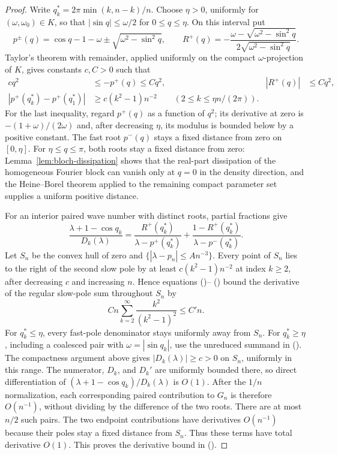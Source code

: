 \documentclass[twoside,10pt]{article}
\numberwithin{equation}{section}
\theoremstyle{slbody}
\theoremstyle{definition}
\theoremstyle{remark}
\renewcommand{\eqref}[1]{%
  \textup{{\normalfont(\oldstylenums{\ref{#1}}}\normalfont)}}
\begin{document}
\begin{proof}
Write $q_k^*=2\pi\min(k,n-k)/n$.  Choose $\eta>0$, uniformly for
$(\omega,\omega_0)\in K$, so that
$|\sin q|\le\omega/2$ for $0\le q\le\eta$.  On this interval put
\[
 p^\pm(q)=\cos q-1-\omega
       \pm\sqrt{\omega^2-\sin^2q},
 \qquad
 R^+(q)=-\frac{\omega-\sqrt{\omega^2-\sin^2q}}
                   {2\sqrt{\omega^2-\sin^2q}}.
\]
Taylor's theorem with remainder, applied uniformly on the compact
$\omega$-projection of $K$, gives constants $c,C>0$ such that
\begin{align}
 c q^2&\le -p^+(q)\le Cq^2,
 &|R^+(q)|&\le Cq^2,\label{eq:fixed-small-wave-bounds}\\
 |p^+(q_k^*)-p^+(q_1^*)|
   &\ge c(k^2-1)n^{-2}\qquad(2\le k\le \eta n/(2\pi)).
 \label{eq:fixed-pole-spacing}
\end{align}
For the last inequality, regard $p^+(q)$ as a function of $q^2$;
its derivative at zero is $-(1+\omega)/(2\omega)$ and, after decreasing
$\eta$, its modulus is bounded below by a positive constant.  The fast
root $p^-(q)$ stays a fixed distance from zero on $[0,\eta]$.
For $\eta\le q\le\pi$, both roots stay a fixed distance from zero:
Lemma~\ref{lem:bloch-dissipation} shows that the real-part dissipation of
the homogeneous Fourier block can vanish only at $q=0$ in the density
direction, and the Heine--Borel theorem
applied to the remaining compact parameter set supplies a uniform
positive distance.

For an interior paired wave number with distinct roots, partial fractions
give
\[
 \frac{\lambda+1-\cos q_k}{D_k(\lambda)}
 =\frac{R^+(q_k^*)}{\lambda-p^+(q_k^*)}
  +\frac{1-R^+(q_k^*)}{\lambda-p^-(q_k^*)}.
\]
Let $S_n$ be the convex hull of zero and
$\{|\lambda-p_n|\le A n^{-3}\}$.  Every point of $S_n$ lies to the
right of the second slow pole by at least
$c(k^2-1)n^{-2}$ at index $k\ge2$, after decreasing $c$ and increasing
$n$.  Hence equations
\eqref{eq:fixed-small-wave-bounds}--\eqref{eq:fixed-pole-spacing}
bound the derivative of the regular slow-pole sum throughout $S_n$ by
\[
 Cn\sum_{k=2}^\infty\frac{k^2}{(k^2-1)^2}\le C'n.
\]
For $q_k^*\le\eta$, every fast-pole denominator stays uniformly away
from $S_n$.  For $q_k^*\ge\eta$, including a coalesced pair with
$\omega=|\sin q_k|$, use the unreduced summand in
\eqref{eq:Gfinite}.  The compactness argument above gives
$|D_k(\lambda)|\ge c>0$ on $S_n$, uniformly in this range.  The numerator,
$D_k$, and $D_k'$ are uniformly bounded there, so direct differentiation
of $(\lambda+1-\cos q_k)/D_k(\lambda)$ is $O(1)$.  After the $1/n$
normalization, each corresponding paired contribution to $G_n$ is
therefore $O(n^{-1})$, without dividing by the difference of the two
roots.  There are at most $n/2$ such pairs.  The two endpoint
contributions have derivatives $O(n^{-1})$ because their poles stay a
fixed distance from $S_n$.  Thus these terms have total derivative
$O(1)$.  This proves the derivative bound in
\eqref{eq:fixed-regular-green-bounds}.


\end{proof}
\end{document}
